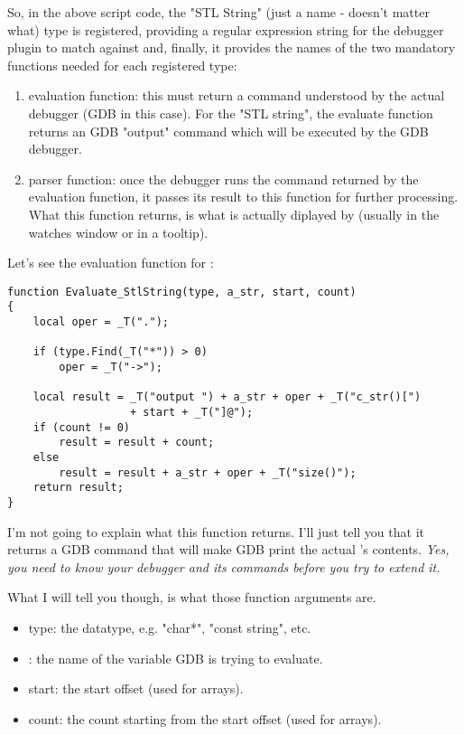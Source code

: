 So, in the above script code, the "STL String" (just a name - doesn't matter what) type is registered, providing a regular expression string for the debugger plugin to match against and, finally, it provides the names of the two mandatory functions needed for each registered type:

\begin{enumerate}
\item evaluation function: this must return a command understood by the actual debugger (GDB in this case). For the "STL string", the evaluate function returns an GDB "output" command which will be executed by the GDB debugger.
\item parser function: once the debugger runs the command returned by the evaluation function, it passes its result to this function for further processing. What this function returns, is what is actually diplayed by \codeblocks (usually in the watches window or in a tooltip).
\end{enumerate}


Let's see the evaluation function for :

\begin{lstlisting}
function Evaluate_StlString(type, a_str, start, count)
{
    local oper = _T(".");

    if (type.Find(_T("*")) > 0)
        oper = _T("->");

    local result = _T("output ") + a_str + oper + _T("c_str()[") 
                   + start + _T("]@");
    if (count != 0)
        result = result + count;
    else
        result = result + a_str + oper + _T("size()");
    return result;
}
\end{lstlisting}

I'm not going to explain what this function returns. I'll just tell you that it returns a GDB command that will make GDB print the actual 's contents. \textit{Yes, you need to know your debugger and its commands before you try to extend it.}

What I will tell you though, is what those function arguments are.

\begin{itemize}
\item type: the datatype, e.g. "char*", "const string", etc.
\item {}: the name of the variable GDB is trying to evaluate.
\item start: the start offset (used for arrays).
\item count: the count starting from the start offset (used for arrays).
\end{itemize}

